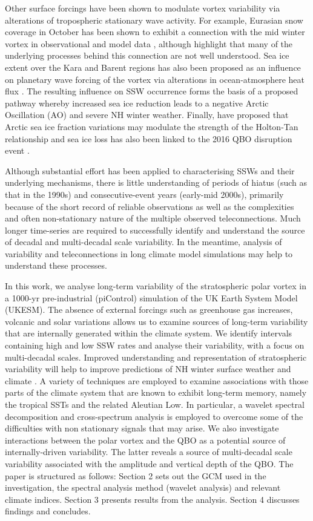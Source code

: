 \documentclass[wcd, manuscript]{copernicus}
\begin{document}
Other surface forcings have been shown to modulate vortex variability via alterations of tropospheric stationary wave activity. For example, Eurasian snow coverage in October has been shown to exhibit a connection with the mid winter vortex in observational and model data \citep{garfinkel20, Cohen2007}, although \cite{Henderson2018} highlight that many of the underlying processes behind this connection are not well understood. Sea ice extent over the Kara and Barent regions has also been proposed as an influence on planetary wave forcing of the vortex via alterations in ocean-atmosphere heat flux \citep{Kim2020, Nakamura2016}. The resulting influence on SSW occurrence forms the basis of a proposed pathway whereby increased sea ice reduction leads to a negative Arctic Oscillation (AO) and severe NH winter weather. Finally, \cite{Hirota2018} have proposed that Arctic sea ice fraction variations may modulate the strength of the Holton-Tan relationship  and sea ice loss has also been linked to the 2016 QBO disruption event \cite{labe2019}. 

Although substantial effort has been applied to characterising SSWs and their underlying mechanisms, there is little understanding of periods of hiatus (such as that in the 1990s) and consecutive-event years (early-mid 2000s), primarily because of the short record of reliable observations as well as the complexities and often non-stationary nature of the multiple observed teleconnections. Much longer time-series are required to successfully identify and understand the source of decadal and multi-decadal scale variability. In the meantime, analysis of variability and teleconnections in long climate model simulations may help to understand these processes. 

In this work, we analyse long-term variability of the stratospheric polar vortex in a 1000-yr pre-industrial (piControl) simulation of the UK Earth System Model (UKESM). The absence of external forcings such as greenhouse gas increases, volcanic and solar variations allows us to examine sources of long-term variability that are internally generated within the climate system. We identify intervals containing high and low SSW rates and analyse their variability, with a focus on multi-decadal scales. Improved  understanding and representation of stratospheric variability will help to improve predictions of NH winter surface weather and climate \citep{Kidston2015,gray2020}. A variety of techniques are employed to examine associations with those parts of the climate system that are known to exhibit long-term memory, namely the tropical SSTs and the related Aleutian Low. In particular, a wavelet spectral decomposition and cross-spectrum analysis is employed to overcome some of the difficulties with non stationary signals that may arise. We also investigate interactions between the polar vortex and the QBO as a potential source of internally-driven variability. The latter reveals a source of multi-decadal scale variability associated with the amplitude and vertical depth of the QBO. The paper is structured as follows: Section 2 sets out the GCM used in the investigation, the spectral analysis method (wavelet analysis) and relevant climate indices. Section 3 presents results from the analysis. Section 4 discusses findings and concludes.
\end{document}
